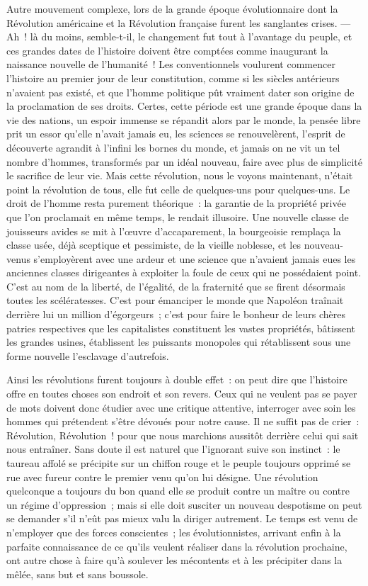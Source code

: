 \documentclass[french,twoside]{book} %
\begin{document}
Autre mouvement complexe, lors de la grande époque évolutionnaire dont la Révolution américaine et la Révolution française furent les sanglantes crises. — Ah ! là du moins, semble-t-il, le changement fut tout à l’avantage du peuple, et ces grandes dates de l’histoire doivent être comptées comme inaugurant la naissance nouvelle de l’humanité ! Les conventionnels voulurent commencer l’histoire au premier jour de leur constitution, comme si les siècles  antérieurs n’avaient pas existé, et que l’homme politique pût vraiment dater son origine de la proclamation de ses droits. Certes, cette période est une grande époque dans la vie des nations, un espoir immense se répandit alors par le monde, la pensée libre prit un essor qu’elle n’avait jamais eu, les sciences se renouvelèrent, l’esprit de découverte agrandit à l’infini les bornes du monde, et jamais on ne vit un tel nombre d’hommes, transformés par un idéal nouveau, faire avec plus de simplicité le sacrifice de leur vie. Mais cette révolution, nous le voyons maintenant, n’était point la révolution de tous, elle fut celle de quelques-uns pour quelques-uns. Le droit de l’homme resta purement théorique : la garantie de la  propriété privée que l’on proclamait en même temps, le rendait illusoire. Une nouvelle classe de jouisseurs avides se mit à l’œuvre d’accaparement, la bourgeoisie remplaça la classe usée, déjà sceptique et pessimiste, de la vieille noblesse, et les nouveau-venus s’employèrent avec une ardeur et une science que n’avaient jamais eues les anciennes classes dirigeantes à exploiter la foule de ceux qui ne possédaient point. C’est au nom de la liberté, de l’égalité, de la fraternité que se firent désormais toutes les scélératesses. C’est pour émanciper le monde que Napoléon traînait derrière lui un million d’égorgeurs ; c’est pour faire le bonheur de leurs chères patries respectives que les capitalistes constituent les vastes propriétés,  bâtissent les grandes usines, établissent les puissants monopoles qui rétablissent sous une forme nouvelle l’esclavage d’autrefois.\par
Ainsi les révolutions furent toujours à double effet : on peut dire que l’histoire offre en toutes choses son endroit et son revers. Ceux qui ne veulent pas se payer de mots doivent donc étudier avec une critique attentive, interroger avec soin les hommes qui prétendent s’être dévoués pour notre cause. Il ne suffit pas de crier : Révolution, Révolution ! pour que nous marchions aussitôt derrière celui qui sait nous entraîner. Sans doute il est naturel que l’ignorant suive son instinct : le taureau affolé se précipite sur un chiffon rouge et le peuple toujours opprimé se rue  avec fureur contre le premier venu qu’on lui désigne. Une révolution quelconque a toujours du bon quand elle se produit contre un maître ou contre un régime d’oppression ; mais si elle doit susciter un nouveau despotisme on peut se demander s’il n’eût pas mieux valu la diriger autrement. Le temps est venu de n’employer que des forces conscientes ; les évolutionnistes, arrivant enfin à la parfaite connaissance de ce qu’ils veulent réaliser dans la révolution prochaine, ont autre chose à faire qu’à soulever les mécontents et à les précipiter dans la mêlée, sans but et sans boussole.\par
\end{document}
